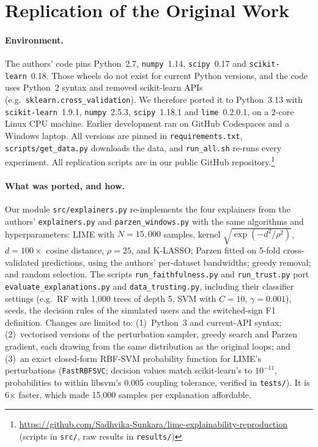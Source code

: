 \documentclass[11pt]{article}
\newcommand{\repo}{\url{https://github.com/Sadhvika-Sunkara/lime-explainability-reproduction}}
\begin{document}
\section{Replication of the Original Work}
\label{sec:repl}
\paragraph{Environment.} The authors' code \citep{limeexperiments} pins Python~2.7, \texttt{numpy}~1.14, \texttt{scipy}~0.17 and \texttt{scikit-learn}~0.18. Those wheels do not exist for current Python versions, and the code uses Python~2 syntax and removed scikit-learn APIs (e.g.\ \texttt{sklearn.cross\_validation}). We therefore ported it to Python~3.13 with \texttt{scikit-learn}~1.9.1, \texttt{numpy}~2.5.3, \texttt{scipy}~1.18.1 and \texttt{lime}~0.2.0.1, on a 2-core Linux CPU machine. Earlier development ran on GitHub Codespaces and a Windows laptop. All versions are pinned in \texttt{requirements.txt}, \texttt{scripts/get\_data.py} downloads the data, and \texttt{run\_all.sh} re-runs every experiment. All replication scripts are in our public GitHub repository.\footnote{\repo{} (scripts in \texttt{src/}, raw results in \texttt{results/})}

\paragraph{What was ported, and how.} Our module \texttt{src/explainers.py} re-implements the four explainers from the authors' \texttt{explainers.py} and \texttt{parzen\_windows.py} with the same algorithms and hyperparameters: LIME with $N{=}15{,}000$ samples, kernel $\sqrt{\exp(-d^2/\rho^2)}$, $d=100\times$ cosine distance, $\rho{=}25$, and K-LASSO; Parzen fitted on 5-fold cross-validated predictions, using the authors' per-dataset bandwidths; greedy removal; and random selection. The scripts \texttt{run\_faithfulness.py} and \texttt{run\_trust.py} port \texttt{evaluate\_explanations.py} and \texttt{data\_trusting.py}, including their classifier settings (e.g.\ RF with 1,000 trees of depth 5, SVM with $C{=}10$, $\gamma{=}0.001$), seeds, the decision rules of the simulated users and the switched-sign F1 definition. Changes are limited to: (1)~Python~3 and current-API syntax; (2)~vectorised versions of the perturbation sampler, greedy search and Parzen gradient, each drawing from the same distribution as the original loops; and (3)~an exact closed-form RBF-SVM probability function for LIME's perturbations (\texttt{FastRBFSVC}; decision values match scikit-learn's to $10^{-11}$, probabilities to within libsvm's 0.005 coupling tolerance, verified in \texttt{tests/}). It is 6$\times$ faster, which made 15,000 samples per explanation affordable.
\end{document}
